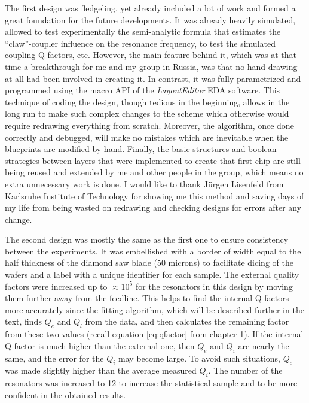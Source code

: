 \documentclass[12pt, twoside]{report}
\numberwithin{equation}{section}
\begin{document}
The first design was fledgeling, yet already included a lot of work and formed a great foundation for the future developments. It was already heavily simulated, allowed to test experimentally the semi-analytic formula that estimates the ``claw''-coupler influence on the resonance frequency, to test the simulated coupling Q-factors, etc. However, the main feature behind it, which was at that time a breakthrough for me and my group in Russia, was that no hand-drawing at all had been involved in creating it. In contrast, it was fully parametrized and programmed using the macro API of the \textit{LayoutEditor} EDA software. This technique of coding the design, though tedious in the beginning, allows in the long run to make such complex changes to the scheme which otherwise would require redrawing everything from scratch. Moreover, the algorithm, once done correctly and debugged, will make no mistakes which are inevitable when the blueprints are modified by hand. Finally, the basic structures and boolean strategies between layers that were implemented to create that first chip are still being reused and extended by me and other people in the group, which means no extra unnecessary work is done. I would like to thank Jürgen Lisenfeld from Karlsruhe Institute of Technology for showing me this method and saving days of my life from being wasted on redrawing and checking designs for errors after any change.

The  second design was mostly the same as the first one to ensure consistency between the experiments. It was embellished with a border of width equal to the half thickness of the diamond saw blade (50 microns) to facilitate dicing of the wafers and a label with a unique identifier for each sample. The external quality factors were increased up to $\approx 10^{5}$ for the resonators in this design by moving them further away from the feedline. This helps to find the internal Q-factors more accurately since the fitting algorithm, which will be described further in the text, finds $Q_e$ and $Q_l$ from the data, and then calculates the remaining factor from these two values (recall equation \eqref{eq:qfactor} from chapter 1). If the internal Q-factor is much higher than the external one, then $Q_e$ and $Q_i$ are nearly the same, and the error for the $Q_i$ may become large. To avoid such situations, $Q_e$ was made slightly higher than the average measured $Q_i$. The number of the resonators was increased to 12 to increase the statistical sample and to be more confident in the obtained results.
\end{document}
